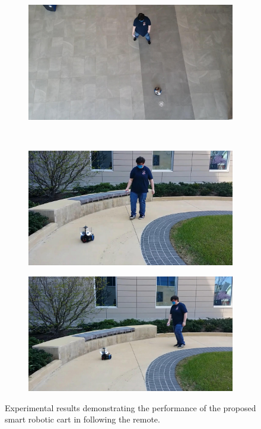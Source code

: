 \documentclass[conference]{IEEEtran}
\begin{document}
\begin{figure}[htbp]
\begin{subfigure}[b]{0.30\linewidth}
    \caption{}
    \label{fig:491}
  \end{subfigure}
  \begin{subfigure}[b]{0.30\linewidth}
    \centering
    \includegraphics[width=\textwidth]{videos/frames/561.jpeg} 
    \caption{}
    \label{fig:561}
  \end{subfigure}
  \\
  \begin{subfigure}[b]{0.30\linewidth}
    \centering
    \includegraphics[width=\textwidth]{videos/frames/631.jpeg} 
    \caption{}
    \label{fig:631}
  \end{subfigure}
  \begin{subfigure}[b]{0.30\linewidth}
    \centering
    \includegraphics[width=\textwidth]{videos/frames/701.jpeg} 
    \caption{}
    \label{fig:701}
  \end{subfigure}
  \caption{Experimental results demonstrating the performance of the proposed smart robotic cart in following the remote.}
  \label{fig:experResultsImages}
\end{figure}
\end{document}
